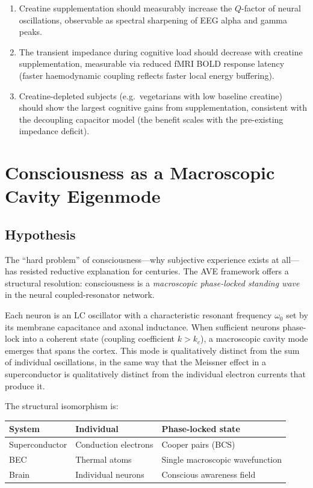 \begin{enumerate}
  \item Creatine supplementation should measurably increase the
        $Q$-factor of neural oscillations, observable as spectral
        sharpening of EEG alpha and gamma peaks.
  \item The transient impedance during cognitive load should
        decrease with creatine supplementation, measurable via
        reduced fMRI BOLD response latency (faster
        haemodynamic coupling reflects faster local energy
        buffering).
  \item Creatine-depleted subjects (e.g.\ vegetarians with low
        baseline creatine) should show the largest cognitive gains
        from supplementation, consistent with the decoupling
        capacitor model (the benefit scales with the pre-existing
        impedance deficit).
\end{enumerate}


\section{Consciousness as a Macroscopic Cavity Eigenmode}
\label{sec:consciousness}

\subsection{Hypothesis}

The ``hard problem'' of consciousness---why subjective experience
exists at all---has resisted reductive explanation for centuries.
The AVE framework offers a structural resolution: consciousness is
a \emph{macroscopic phase-locked standing wave} in the neural
coupled-resonator network.

Each neuron is an LC oscillator with a characteristic resonant
frequency $\omega_0$ set by its membrane capacitance and axonal
inductance.  When sufficient neurons phase-lock into a coherent
state (coupling coefficient $k > k_c$), a macroscopic cavity mode
emerges that spans the cortex.  This mode is qualitatively distinct
from the sum of individual oscillations, in the same way that the
Meissner effect in a superconductor is qualitatively distinct from
the individual electron currents that produce it.

The structural isomorphism is:
\begin{center}
\begin{tabularx}{\textwidth}{@{}llX@{}}
  \toprule
  \textbf{System} & \textbf{Individual} & \textbf{Phase-locked state} \\
  \midrule
  Superconductor & Conduction electrons & Cooper pairs (BCS) \\
  BEC            & Thermal atoms        & Single macroscopic wavefunction \\
  Brain          & Individual neurons   & Conscious awareness field \\
  \bottomrule
\end{tabularx}
\end{center}

